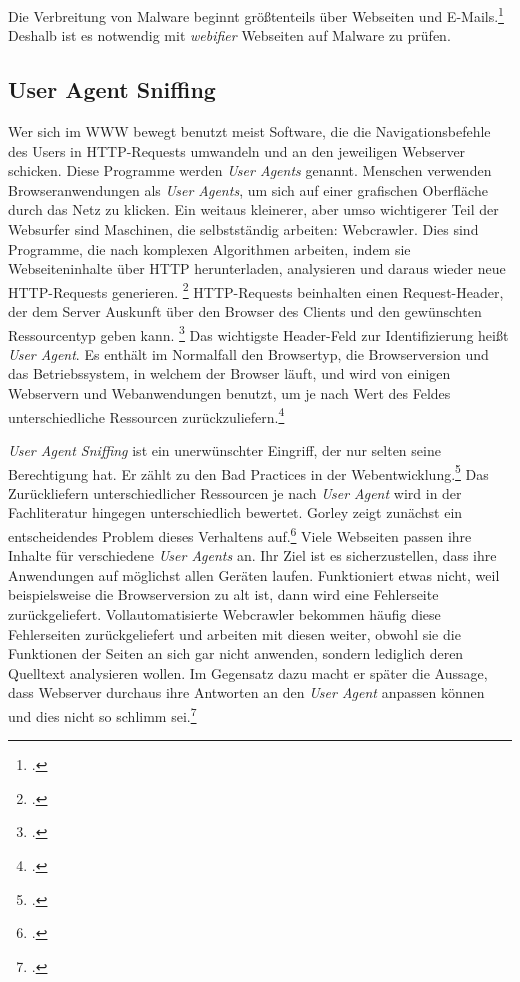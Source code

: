 Die Verbreitung von Malware beginnt größtenteils über Webseiten und
E-Mails.\footcite[Vgl.][97]{netzwerkDatensicherheit} Deshalb ist es notwendig mit \textit{webifier}
Webseiten auf Malware zu prüfen.


\subsection{User Agent Sniffing}
\label{sec:user-agent-sniffing}

Wer sich im \ac{WWW} bewegt benutzt meist Software, die die Navigationsbefehle des Users in
HTTP-Requests umwandeln und an den jeweiligen Webserver schicken.
Diese Programme werden \textit{User Agents} genannt.
Menschen verwenden Browseranwendungen als \textit{User Agents}, um sich auf einer grafischen
Oberfläche durch das Netz zu klicken.
Ein weitaus kleinerer, aber umso wichtigerer Teil der Websurfer sind Maschinen, die selbstständig
arbeiten: Webcrawler.
Dies sind Programme, die nach komplexen Algorithmen arbeiten, indem sie Webseiteninhalte über HTTP
herunterladen, analysieren und daraus wieder neue HTTP-Requests generieren.
\footcite[Vgl.][19]{httpGuide}
HTTP-Requests beinhalten einen Request-Header, der dem Server Auskunft über den Browser des Clients
und den gewünschten Ressourcentyp geben kann.
\footcite[Vgl.][9]{httpReference}
Das wichtigste Header-Feld zur Identifizierung heißt \textit{User Agent}. Es enthält im Normalfall
den Browsertyp, die Browserversion und das Betriebssystem, in welchem der Browser läuft, und
wird von einigen Webservern und Webanwendungen benutzt, um je nach Wert des Feldes unterschiedliche Ressourcen
zurückzuliefern.\footcite[Vgl.][259, 528\psq]{httpGuide}

\textit{User Agent Sniffing} ist ein unerwünschter Eingriff,
der nur selten seine Berechtigung hat.
Er zählt zu den Bad Practices in der Webentwicklung.\footcite[Vgl.][]{mdnBrowserDetection}
Das Zurückliefern unterschiedlicher Ressourcen je nach \textit{User Agent} wird in der
Fachliteratur hingegen unterschiedlich bewertet.
Gorley zeigt zunächst ein entscheidendes Problem dieses
Verhaltens auf.\footcite[Vgl.][228]{httpGuide}
Viele Webseiten passen ihre Inhalte für verschiedene \textit{User Agents} an.
Ihr Ziel ist es sicherzustellen, dass ihre Anwendungen auf möglichst allen Geräten laufen.
Funktioniert etwas nicht, weil beispielsweise die Browserversion zu alt ist, dann wird eine
Fehlerseite zurückgeliefert.
Vollautomatisierte Webcrawler bekommen häufig diese Fehlerseiten zurückgeliefert und arbeiten mit
diesen weiter, obwohl sie die Funktionen der Seiten an sich gar nicht anwenden, sondern lediglich
deren Quelltext analysieren wollen.
Im Gegensatz dazu macht er später die Aussage, dass Webserver durchaus ihre Antworten
an den \textit{User Agent} anpassen können und dies nicht so schlimm
sei.\footcite[Vgl.][402]{httpGuide}

